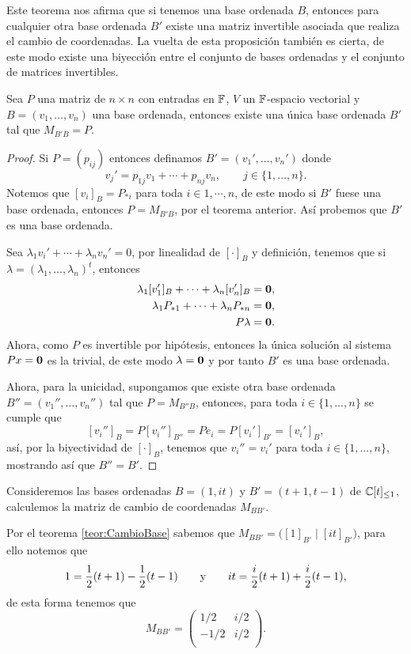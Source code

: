 Este teorema nos afirma que si tenemos una base ordenada $B$, entonces para cualquier otra base ordenada $B'$ existe una matriz invertible asociada que realiza el cambio de coordenadas. La vuelta de esta proposición también es cierta, de este modo existe una biyección entre el conjunto de bases ordenadas y el conjunto de matrices invertibles.

\begin{prop}\label{prop:ExBase}
  Sea $P$ una matriz de $n\times n$ con entradas en $\mathbb{F}$, $V$ un $\mathbb{F}$-espacio vectorial y $B = (v_1, \ldots, v_n)$ una base ordenada, entonces existe una única base ordenada $B'$ tal que $M_{B'B} = P$.
\end{prop}
\begin{proof}
  Si $P = (p_{ij})$ entonces definamos $B' = (v_1', \ldots, v_n')$ donde
    \[ v_j' = p_{1j}v_1 + \cdots +  p_{nj}v_n,     \qquad j \in \{1,\ldots, n\}. \]
  Notemos que $[v_i]_B = P_{*i}$ para toda $i \in 1,\cdots,n$, de este modo si $B'$ fuese una base ordenada, entonces $P = M_{B'B}$, por el teorema anterior. Así probemos que $B'$ es una base ordenada.

  Sea $\lambda_1 v_i' + \cdots + \lambda_n v_n' = 0$, por linealidad de $[\cdot]_B$ y definición, tenemos que si $\lambda = (\lambda_1, \ldots, \lambda_n)^t$, entonces
  \begin{align*}
    \lambda_1 [v_1']_B + \cdots + \lambda_n [v_n']_B &= \mathbf{0} ,\\
    \lambda_1 P_{*1} + \cdots + \lambda_n P_{*n} &= \mathbf{0} ,\\
    P\lambda &= \mathbf{0}.
  \end{align*}
  Ahora, como $P$ es invertible por hipótesis, entonces la única solución al sistema $Px = \mathbf{0}$ es la trivial, de este modo $\lambda = \mathbf{0}$ y por tanto $B'$ es una base ordenada.

  Ahora, para la unicidad, supongamos que existe otra base ordenada $B'' = (v_1'', \ldots, v_n'')$ tal que $P = M_{B''B}$, entonces, para toda $i \in \{1,\ldots,n\}$ se cumple que
  \[ [v_i'']_B =  P[v_i'']_{B''} = Pe_i = P[v_i']_{B'} = [v_i']_B, \]
  así, por la biyectividad de $[\cdot]_B$, tenemos que $v_i'' = v_i'$ para toda $i \in \{1,\ldots,n\}$, mostrando así que $B'' = B'$.
\end{proof}

\begin{example}
  Consideremos las bases ordenadas $B = ( 1, it )$ y $B' = (t+1, t-1)$ de $\mathbb{C}[t]_{\leq 1}$, calculemos la matriz de cambio de coordenadas $M_{BB'}$.

  \examplesolution
  Por el teorema \ref{teor:CambioBase} sabemos que $M_{BB'} = \bigl( [1]_{B'} \mid [it]_{B'} \bigr)$, para ello notemos que
  \[
    1 = \frac{1}{2} (t+1) - \frac{1}{2}(t-1)
      \qquad\text{y}\qquad
    it =  \frac{i}{2}(t+1) + \frac{i}{2}(t-1),
  \]
  de esta forma tenemos que 
  \[ M_{BB'} = \begin{pmatrix}
    1/2  & i/2 \\
    -1/2 & i/2 \\
  \end{pmatrix}. \]
\end{example}

